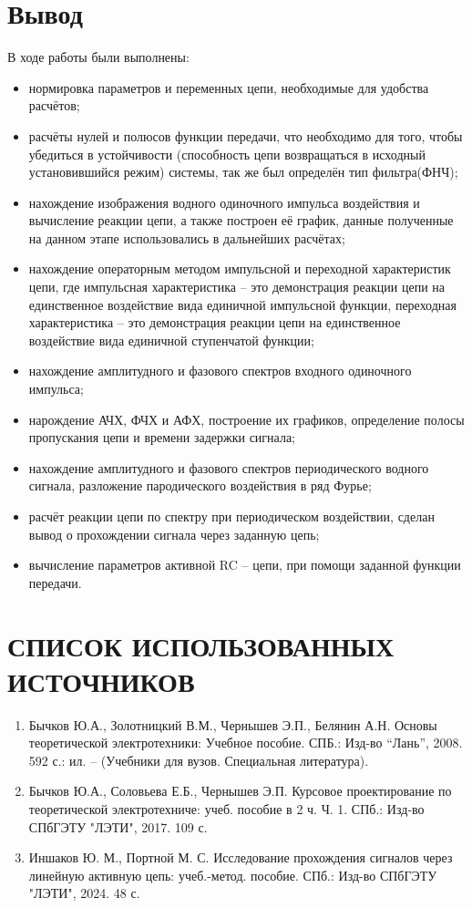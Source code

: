 \documentclass[a4paper,14pt ]{article} %
\begin{document}
\section{Вывод}
В ходе работы были выполнены:
\begin{itemize}
    \item нормировка параметров и переменных цепи, необходимые для удобства расчётов; 
    \item расчёты нулей и полюсов функции передачи, что необходимо для того, чтобы убедиться в устойчивости (способность цепи возвращаться в исходный установившийся режим) системы, так же был определён тип фильтра(ФНЧ); 
    \item нахождение изображения водного одиночного импульса воздействия и вычисление реакции цепи, а также построен её график, данные полученные на данном этапе использовались в дальнейших расчётах;
    \item нахождение операторным методом импульсной и переходной характеристик цепи, где импульсная характеристика – это демонстрация реакции цепи на единственное воздействие вида единичной импульсной функции, переходная характеристика – это демонстрация реакции цепи на единственное воздействие вида единичной ступенчатой функции;
    \item нахождение амплитудного и фазового спектров входного одиночного импульса;
    \item нарождение АЧХ, ФЧХ и АФХ, построение их графиков, определение полосы пропускания цепи и времени задержки сигнала;
    \item нахождение амплитудного и фазового спектров периодического водного сигнала, разложение пародического воздействия в ряд Фурье;
    \item расчёт реакции цепи по спектру при периодическом воздействии, сделан вывод о прохождении сигнала через заданную цепь;
    \item вычисление параметров активной RC – цепи, при помощи заданной функции передачи.
\end{itemize}
\newpage
\section{СПИСОК ИСПОЛЬЗОВАННЫХ ИСТОЧНИКОВ}
\begin{enumerate}
    \item Бычков Ю.А., Золотницкий В.М., Чернышев Э.П., Белянин А.Н. Основы теоретической электротехники: Учебное пособие. СПБ.: Изд-во “Лань”, 2008.  592 с.: ил. – (Учебники для вузов. Специальная литература). 
    \item Бычков Ю.А., Соловьева Е.Б., Чернышев Э.П. Курсовое проектирование по теоретической электротехниче: учеб. пособие в 2 ч. Ч. 1. СПб.: Изд-во СПбГЭТУ "ЛЭТИ", 2017. 109 с. 
    \item Иншаков Ю. М., Портной М. С. Исследование прохождения сигналов через линейную активную цепь: учеб.-метод. пособие. СПб.: Изд-во СПбГЭТУ "ЛЭТИ", 2024. 48 с. 
\end{enumerate}
\end{document}
